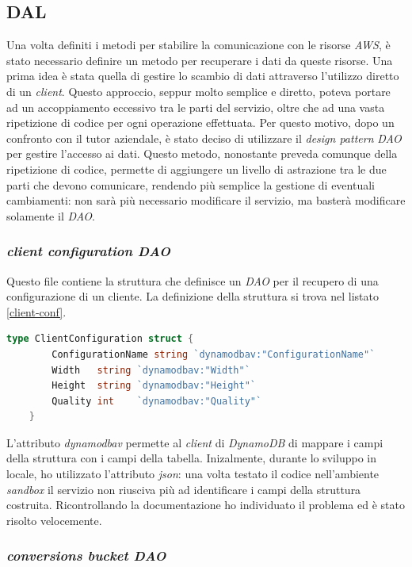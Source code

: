 \subsection{DAL}

Una volta definiti i metodi per stabilire la comunicazione con le risorse
\emph{AWS}, è stato necessario definire un metodo per recuperare i dati da
queste risorse. Una prima idea è stata quella di gestire lo scambio di dati
attraverso l'utilizzo diretto di un \emph{client}. Questo approccio, seppur
molto semplice e diretto, poteva portare ad un accoppiamento eccessivo tra le
parti del servizio, oltre che ad una vasta ripetizione di codice per ogni
operazione effettuata. Per questo motivo, dopo un confronto con il tutor
aziendale, è stato deciso di utilizzare il \emph{design pattern} \emph{DAO} per
gestire l'accesso ai dati. Questo metodo, nonostante preveda comunque della
ripetizione di codice, permette di aggiungere un livello di astrazione tra le
due parti che devono comunicare, rendendo più semplice la gestione di eventuali
cambiamenti: non sarà più necessario modificare il servizio, ma basterà
modificare solamente il \emph{DAO}.

\subsubsection{\emph{client configuration DAO}}

Questo file contiene la struttura che definisce un \emph{DAO} per il recupero di
una configurazione di un cliente. La definizione della struttura si trova nel listato \ref{client-conf}.
\begin{lstlisting}[label=client-conf, caption={Struttura di una configurazione di un cliente},captionpos=b, language=go]
type ClientConfiguration struct {
        ConfigurationName string `dynamodbav:"ConfigurationName"`
        Width   string `dynamodbav:"Width"`
        Height  string `dynamodbav:"Height"`
        Quality int    `dynamodbav:"Quality"`
    }
\end{lstlisting}
L'attributo \emph{dynamodbav} permette al \emph{client} di \emph{DynamoDB} di
mappare i campi della struttura con i campi della tabella. Inizalmente, durante
lo sviluppo in locale, ho utilizzato l'attributo \emph{json}: una volta testato
il codice nell'ambiente \emph{sandbox} il servizio non riusciva più ad
identificare i campi della struttura costruita. Ricontrollando la documentazione
ho individuato il problema ed è stato risolto velocemente.

\subsubsection{\emph{conversions bucket DAO}}

